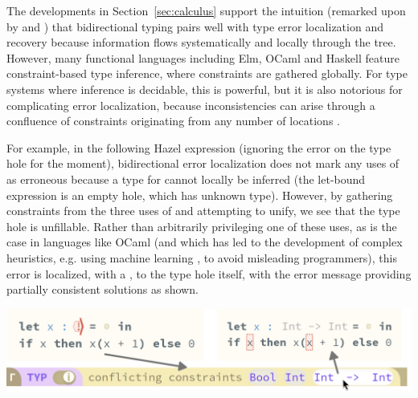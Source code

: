 % 

The developments in Section~\ref{sec:calculus} support the intuition (remarked upon by \citet{Localinf} and \citet{BidirTyping}) that bidirectional typing pairs well with type error localization and recovery because information flows systematically and locally through the tree. However, many functional languages including Elm, OCaml and Haskell feature constraint-based type inference, where constraints are gathered globally. For type systems where inference is decidable, this is powerful, but it is also notorious for complicating error localization, because inconsistencies can arise through a confluence of constraints originating from any number of locations \cite{DBLP:conf/popl/Wand86}. 

For example, in the following Hazel expression (ignoring the error on the type hole for the moment), bidirectional error localization 
does not mark any uses of  as erroneous because a type for  cannot locally be inferred (the let-bound expression is an empty hole, which has unknown type). However, by gathering constraints from the three uses of  and attempting to unify, we see that the type hole is unfillable. Rather than arbitrarily privileging one of these uses, as is the case in languages like OCaml (and which has led to the development of complex heuristics, e.g. using machine learning \cite{SeidelBlame}, to avoid misleading programmers), this error is localized, with a \li{!}, to the type hole itself, with the error message providing partially consistent solutions as shown.
\\
\begin{center}
    \includegraphics[scale=0.4]{images/figSugg.png}
\end{center}


